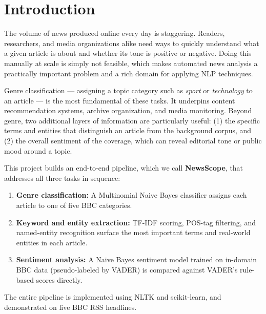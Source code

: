 \section{Introduction}
\label{sec:intro}

The volume of news produced online every day is staggering. Readers, researchers, and media organizations alike need ways to quickly understand what a given article is about and whether its tone is positive or negative. Doing this manually at scale is simply not feasible, which makes automated news analysis a practically important problem and a rich domain for applying NLP techniques.

Genre classification — assigning a topic category such as \textit{sport} or \textit{technology} to an article — is the most fundamental of these tasks. It underpins content recommendation systems, archive organization, and media monitoring. Beyond genre, two additional layers of information are particularly useful: (1) the specific terms and entities that distinguish an article from the background corpus, and (2) the overall sentiment of the coverage, which can reveal editorial tone or public mood around a topic.

This project builds an end-to-end pipeline, which we call \textbf{NewsScope}, that addresses all three tasks in sequence:

\begin{enumerate}
    \item \textbf{Genre classification:} A Multinomial Naive Bayes classifier assigns each article to one of five BBC categories.
    \item \textbf{Keyword and entity extraction:} TF-IDF scoring, POS-tag filtering, and named-entity recognition surface the most important terms and real-world entities in each article.
    \item \textbf{Sentiment analysis:} A Naive Bayes sentiment model trained on in-domain BBC data (pseudo-labeled by VADER) is compared against VADER's rule-based scores directly.
\end{enumerate}

The entire pipeline is implemented using NLTK \cite{bird2009natural} and scikit-learn, and demonstrated on live BBC RSS headlines.


